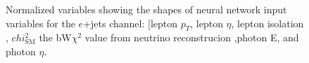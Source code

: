 \begin{figure}[h!]
\vspace{-4.5mm}
\hfil
{}
\caption{Normalized variables showing the shapes of neural network input variables for the $e$+jets channel: [lepton $p_T$, lepton $\eta$, lepton isolation , $chi^2_{\text{SM}}$ the bW$\chi^2$ value from neutrino reconstrucion ,photon E, and photon $\eta$.  }
\label{fig:VarPlotsej5}
\end{figure}

